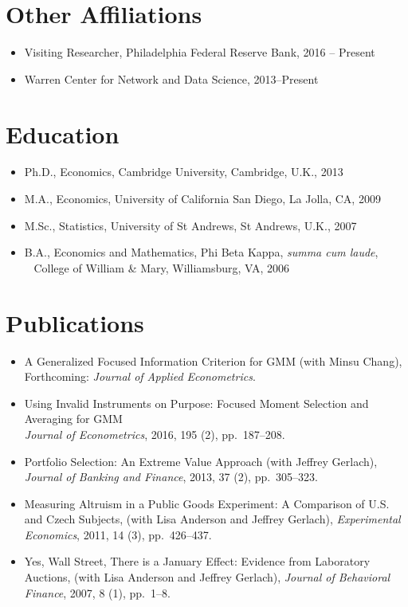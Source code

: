 \documentclass[line,overlapped]{myres}
\begin{document}
\begin{resume}
\section{\sc Other Affiliations}
\begin{itemize}
\item Visiting Researcher, Philadelphia Federal Reserve Bank, 2016 -- Present
\item Warren Center for Network and Data Science, 2013--Present
\end{itemize}

\section{\sc Education}
\begin{itemize}
\item Ph.D., Economics, Cambridge University, Cambridge, U.K., 2013
\item M.A., Economics, University of California San Diego, La Jolla, CA, 2009
\item M.Sc., Statistics, University of St Andrews, St Andrews, U.K., 2007
\item B.A., Economics and Mathematics, Phi Beta Kappa, \emph{summa cum laude},\\ 
  \-\ \hspace{1em} College of William \& Mary, Williamsburg, VA, 2006
\end{itemize}




\section{\sc Publications}
\begin{itemize}
  \item A Generalized Focused Information Criterion for GMM (with Minsu Chang), Forthcoming: \emph{Journal of Applied Econometrics}.
  \item Using Invalid Instruments on Purpose: Focused Moment Selection and Averaging for GMM\\ \emph{Journal of Econometrics}, 2016, 195 (2), pp.\ 187--208.
	\item Portfolio Selection: An Extreme Value Approach (with Jeffrey Gerlach), \emph{Journal of Banking and Finance}, 2013, 37 (2), pp.\ 305--323.
	\item Measuring Altruism in a Public Goods Experiment:  A Comparison of U.S. and Czech Subjects, (with Lisa Anderson and Jeffrey Gerlach), \emph{Experimental Economics}, 2011, 14 (3), pp.\ 426--437.
	\item Yes, Wall Street, There is a January Effect: Evidence from Laboratory Auctions, (with Lisa Anderson and Jeffrey Gerlach), \emph{Journal of Behavioral Finance}, 2007, 8 (1), pp.\ 1--8. 
\end{itemize}



\end{resume}
\end{document}
